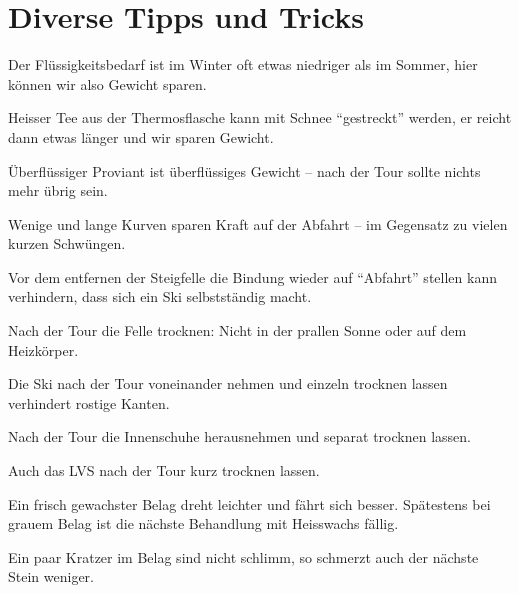 \section{Diverse Tipps und Tricks}

Der Flüssigkeitsbedarf ist im Winter oft etwas niedriger als im Sommer, hier können wir also Gewicht sparen.

Heisser Tee aus der Thermosflasche kann mit Schnee \enquote{gestreckt} werden, er reicht dann etwas länger und wir sparen Gewicht.

Überflüssiger Proviant ist überflüssiges Gewicht -- nach der Tour sollte nichts mehr übrig sein.

Wenige und lange Kurven sparen Kraft auf der Abfahrt -- im Gegensatz zu vielen kurzen Schwüngen.

Vor dem entfernen der Steigfelle die Bindung wieder auf \enquote{Abfahrt} stellen kann verhindern, dass sich ein Ski selbstständig macht.

Nach der Tour die Felle trocknen: Nicht in der prallen Sonne oder auf dem Heizkörper.

Die Ski nach der Tour voneinander nehmen und einzeln trocknen lassen verhindert rostige Kanten.

Nach der Tour die Innenschuhe herausnehmen und separat trocknen lassen.

Auch das LVS nach der Tour kurz trocknen lassen.

Ein frisch gewachster Belag dreht leichter und fährt sich besser.
Spätestens bei grauem Belag ist die nächste Behandlung mit Heisswachs fällig.

Ein paar Kratzer im Belag sind nicht schlimm, so schmerzt auch der nächste Stein weniger.
